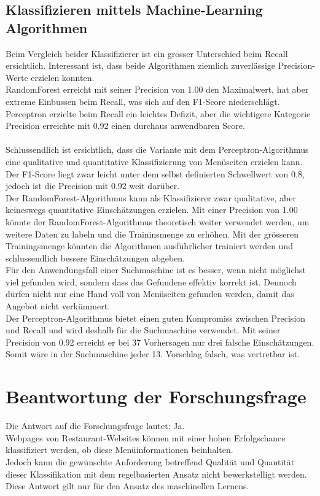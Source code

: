 \subsection{Klassifizieren mittels Machine-Learning Algorithmen}
Beim Vergleich beider Klassifizierer ist ein grosser Unterschied beim Recall ersichtlich.
Interessant ist, dass beide Algorithmen ziemlich zuverlässige Precision-Werte erzielen konnten.\\
RandomForest erreicht mit seiner Precision von 1.00 den Maximalwert, hat aber extreme Einbussen beim Recall, was sich auf den F1-Score niederschlägt.\\
Perceptron erzielte beim Recall ein leichtes Defizit, aber die wichtigere Kategorie Precision erreichte mit 0.92 einen durchaus anwendbaren Score.
\\\\
Schlussendlich ist ersichtlich, dass die Variante mit dem Perceptron-Algorithmus eine qualitative und quantitative Klassifizierung von Menüseiten erzielen kann.
Der F1-Score liegt zwar leicht unter dem selbst definierten Schwellwert von 0.8, jedoch ist die Precision mit 0.92 weit darüber.\\
Der RandomForest-Algorithmus kann als Klassifizierer zwar qualitative, aber keineswegs quantitative Einschätzungen erzielen.
Mit einer Precision von 1.00 könnte der RandomForest-Algorithmus theoretisch weiter verwendet werden, um weitere Daten zu labeln und die Traininsmenge zu erhöhen.
Mit der grösseren Trainingsmenge könnten die Algorithmen ausführlicher trainiert werden und schlussendlich bessere Einschätzungen abgeben.
\\

Für den Anwendungsfall einer Suchmaschine ist es besser, wenn nicht möglichst viel gefunden wird, sondern dass das Gefundene effektiv korrekt ist.
Dennoch dürfen nicht nur eine Hand voll von Menüseiten gefunden werden, damit das Angebot nicht verkümmert.\\
Der Perceptron-Algorithmus bietet einen guten Kompromiss zwischen Precision und Recall und wird deshalb für die Suchmaschine verwendet.
Mit seiner Precision von 0.92 erreicht er bei 37 Vorhersagen nur drei falsche Einschätzungen.
Somit wäre in der Suchmaschine jeder 13. Vorschlag falsch, was vertretbar ist.
\section{Beantwortung der Forschungsfrage}
Die Antwort auf die Forschungsfrage lautet: Ja.\\ Webpages von Restaurant-Websites können mit einer hohen Erfolgschance klassifiziert werden, ob diese Menüinformationen beinhalten.\\
Jedoch kann die gewünschte Anforderung betreffend Qualität und Quantität dieser Klassifikation mit dem regelbasierten Ansatz nicht bewerkstelligt werden.
Diese Antwort gilt nur für den Ansatz des maschinellen Lernens.
